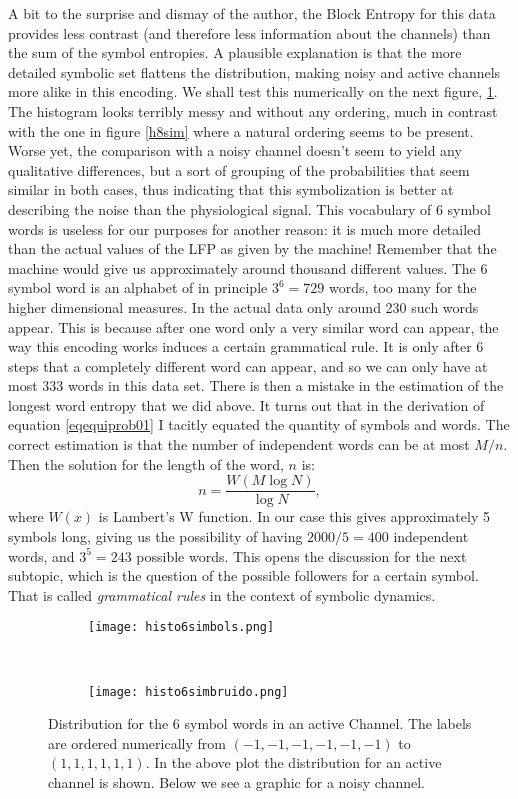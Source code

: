 \documentclass[10pt]{article}
\begin{document}
A bit to the surprise and dismay of the author, the Block Entropy for this
data provides less contrast (and therefore less information about the channels)
than the sum of the symbol entropies. A plausible explanation is that the
more detailed symbolic set flattens the distribution, making noisy and
active channels more alike in this encoding. We shall test this numerically
on the next figure, \ref{histo6simbols}. The histogram looks terribly
messy and without any ordering, much in contrast with the one in figure
\ref{h8sim} where a natural ordering seems to be present. Worse yet,
the comparison with a noisy channel doesn't seem to yield any qualitative
differences, but a sort of grouping of the probabilities that seem similar
in both cases, thus indicating that this symbolization is better at
describing the noise than the physiological signal. This vocabulary of 6
symbol words is useless for our purposes for another reason: it is much
more detailed than the actual values of the LFP as given by the machine!
Remember that the machine would give us approximately around thousand different
values. The 6 symbol word is an alphabet of in principle $3^6=729$ words,
too many for the higher dimensional measures. In the actual data only
around 230 such words appear. This is because after one word only a
very similar word can appear, the way this encoding works induces
a certain grammatical rule. It is only after 6 steps that a completely
different word can appear, and so we can only have at most 333 words
in this data set. There is then a mistake in the estimation of the longest
word entropy that we did above. It turns out that in the derivation
of equation \ref{eqequiprob01} I tacitly equated the quantity of symbols
and words. The correct estimation is that the number of independent words
can be at most $M/n$. Then the solution for the length of the
word, $n$ is:
\begin{equation}
  n=\frac{W(M \log N)}{\log N},
\end{equation}
where $W(x)$ is Lambert's W function. In our case this gives approximately
5 symbols long, giving us the possibility of having $2000/5=400$ independent
words, and $3^5=243$ possible words. This opens the discussion for the next
subtopic, which is the question of the possible followers for a certain symbol.
That is called \emph{grammatical rules} in the context of symbolic dynamics.

\begin{figure}[h]
  \centering
  \begin{subfigure}[b]{\textwidth}
  \texttt{[image: histo6simbols.png]}  
  \end{subfigure} \\
  \begin{subfigure}[b]{\textwidth}
  \texttt{[image: histo6simbruido.png]}  
  \end{subfigure} 
  \caption{Distribution for the 6 symbol words in an active
    Channel. The labels are ordered numerically from
    $(-1,-1, -1, -1,-1,-1)$ to $(1,1,1,1,1,1)$. In the above
    plot the distribution for an active channel is shown. Below we see
    a graphic for a noisy channel. 
  }\label{histo6simbols}
\end{figure}
\end{document}
